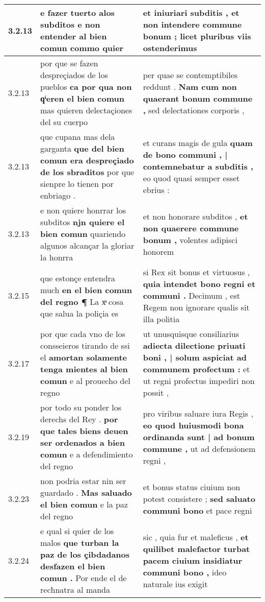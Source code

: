 \begin{tabular}{|p{1cm}|p{6.5cm}|p{6.5cm}|}
3.2.13 & e fazer tuerto alos subditos \textbf{ e non entender al bien comun } commo quier & et iniuriari subditis , \textbf{ et non intendere commune bonum ; } licet pluribus viis ostenderimus \\\hline
3.2.13 & por que se fazen despreçiados de los pueblos \textbf{ ca por qua non qͥeren el bien comun } mas quieren delectaçiones del su cuerpo & per quae se contemptibiles reddunt . \textbf{ Nam cum non quaerant bonum commune , } sed delectationes corporis , \\\hline
3.2.13 & que cupana mas dela garganta \textbf{ que del bien comun era despreçiado de los sbraditos } por que sienpre lo tienen por enbriago . & et curans magis de gula \textbf{ quam de bono communi , | contemnebatur a subditis , } eo quod quasi semper esset ebrius : \\\hline
3.2.13 & e non quiere honrrar los subditos \textbf{ njn quiere el bien comun } quariendo algunos alcançar la gloriar la honrra & et non honorare subditos , \textbf{ et non quaerere commune bonum , } volentes adipisci honorem \\\hline
3.2.15 & que estonçe entendra much \textbf{ en el bien comun del regno ¶ } La xͣ cosa que salua la poliçia es & si Rex sit bonus et virtuosus , \textbf{ quia intendet bono regni et communi . } Decimum , est Regem non ignorare qualis sit illa politia \\\hline
3.2.17 & por que cada vno de los consseieros tirando de ssi el \textbf{ amortan solamente tenga mientes al bien comun } e al prouecho del regno & ut unusquisque consiliarius \textbf{ adiecta dilectione priuati boni , | solum aspiciat ad communem profectum : } et ut regni profectus impediri non possit , \\\hline
3.2.19 & por todo su ponder los derechs del Rey . \textbf{ por que tales biens deuen ser ordenados a bien comun } e a defendimiento del regno & pro viribus saluare iura Regis , \textbf{ eo quod huiusmodi bona ordinanda sunt | ad bonum commune , } ut ad defensionem regni , \\\hline
3.2.23 & non podria estar nin ser guardado . \textbf{ Mas saluado el bien comun } e la paz del regno & et bonus status ciuium non potest consistere ; \textbf{ sed saluato communi bono } et pace regni \\\hline
3.2.24 & e qual si quier de los malos \textbf{ que turban la paz de los çibdadanos desfazen el bien comun . } Por ende el de recħnatra al manda & sic , quia fur et maleficus , \textbf{ et quilibet malefactor turbat pacem ciuium insidiatur communi bono , } ideo naturale ius exigit \\\hline

\end{tabular}
